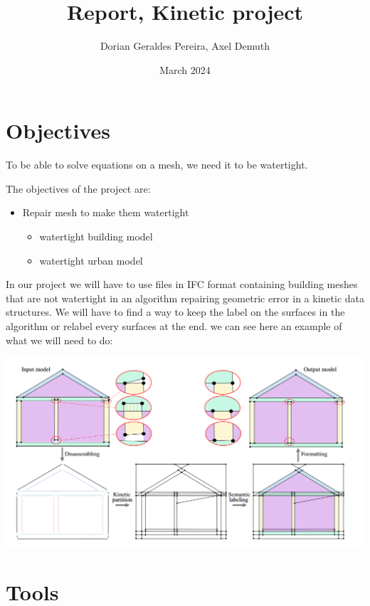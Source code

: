 \documentclass{article}
\title{Report, Kinetic project}
\author{Dorian Geraldes Pereira, Axel Demuth}
\date{March 2024}
\begin{document}
\maketitle
\tableofcontents
\newpage


\section{Objectives}
To be able to solve equations on a mesh, we need it to be watertight.

The objectives of the project are:

\begin{itemize}
    \item Repair mesh to make them watertight
   

    \begin{itemize}
        \item watertight building model
        

        \item watertight urban model
    \end{itemize} 
\end{itemize} 

In our project we will have to use files in IFC format containing building meshes that are not watertight in an algorithm repairing
geometric error in a kinetic data structures. We will have to find a way to keep the label 
on the surfaces in the algorithm or relabel every surfaces at the end.
we can see here an example of what we will need to do:

\includegraphics[scale = 0.37]{../images/example_algorithm_2.png}



\section{Tools}
\end{document}
